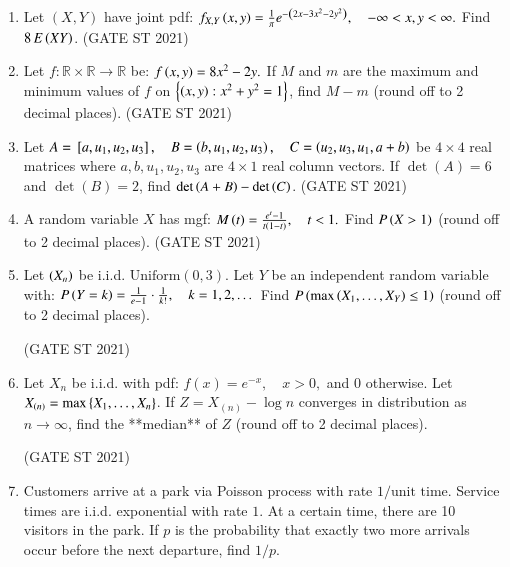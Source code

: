 \documentclass[journal,12pt,onecolumn]{IEEEtran}
\theoremstyle{remark}
\begin{document}
\begin{enumerate}
\item
Let $(X,Y)$ have joint pdf:
$
f_{X,Y}\left(x,y\right) = \frac{1}{\pi} e^{-\left(2x - 3x^2 - 2y^2\right)}, \quad -\infty < x,y < \infty.
$
Find $8 \, E\left(XY\right)$.
\hfill (GATE ST 2021) \\

\item
Let $f: \mathbb{R} \times \mathbb{R} \to \mathbb{R}$ be:
$
f\left(x,y\right)= 8x^2 - 2y.
$
If $M$ and $m$ are the maximum and minimum values of $f$ on $\left\{ \left(x,y\right) : x^2 + y^2 = 1 \right\}$,  
find $M - m$ (round off to 2 decimal places).
\hfill (GATE ST 2021) \\


\item
Let 
$
A = {}\left[a, u_1, u_2, u_3\right], \quad
B = \left(b, u_1, u_2, u_3\right), \quad
C = \left(u_2, u_3, u_1, a+b\right)
$
be $4\times 4$ real matrices where $a,b,u_1,u_2,u_3$ are $4 \times 1$ real column vectors.  
If $\det(A) = 6$ and $\det(B) = 2$, find $\det\left(A+B\right) - \det\left(C\right)$.
\hfill (GATE ST 2021) \\
\item
A random variable $X$ has mgf:
$
M\left(t\right) = \frac{e^t - 1}{t\left(1-t\right)}, \quad t < 1.
$
Find $P\left(X > 1\right)$ (round off to 2 decimal places).
\hfill (GATE ST 2021) \\
\item
Let $\left( X_n \right)$ be i.i.d. $\text{Uniform}(0,3)$.  
Let $Y$ be an independent random variable with:
$
P\left(Y = k\right) = \frac{1}{e-1} \cdot \frac{1}{k!}, \quad k = 1,2,\dots
$
Find $P\left( \max\left( X_1,\dots,X_Y \right) \le 1 \right)$ (round off to 2 decimal places).

\hfill (GATE ST 2021) \\


\item
Let  $X_n$ be i.i.d. with pdf:
$
f(x) = e^{-x}, \quad x > 0,
$
and $0$ otherwise.  
Let $X_{(n)} = \max\left\{ X_1,\dots,X_n \right\}$. If 
$
Z = X_{(n)} - \log n
$
converges in distribution as $n \to \infty$, find the **median** of $Z$ (round off to 2 decimal places).

\hfill (GATE ST 2021) \\

\item
Customers arrive at a park via Poisson process with rate $1/\text{unit time}$.  
Service times are i.i.d. exponential with rate $1$. At a certain time, there are 10 visitors in the park.  
If $p$ is the probability that exactly two more arrivals occur before the next departure, find $1/p$.


\end{enumerate}
\end{document}
